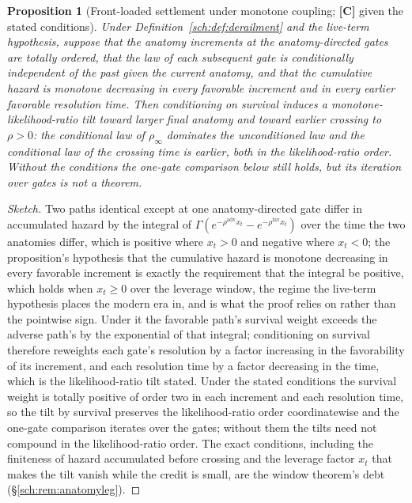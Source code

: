 \documentclass[11pt]{article}
\theoremstyle{plain}
\newtheorem{proposition}[theorem]{Proposition}
\theoremstyle{definition}
\theoremstyle{remark}
\begin{document}
\begin{proposition}[Front-loaded settlement under monotone coupling;
\textbf{[C]} given the stated conditions]\label{sch:prop:settlement}
Under Definition~\ref{sch:def:derailment} and the live-term
hypothesis, suppose that the anatomy increments at the anatomy-directed
gates are totally ordered, that the law of each subsequent gate is
conditionally independent of the past given the current anatomy, and
that the cumulative hazard is monotone decreasing in every favorable
increment and in every earlier favorable resolution time. Then
conditioning on survival induces a monotone-likelihood-ratio tilt
toward larger final anatomy and toward earlier crossing to $\rho>0$: the
conditional law of $\rho_\infty$ dominates the unconditioned law and
the conditional law of the crossing time is earlier, both in the
likelihood-ratio order. Without the conditions the one-gate comparison
below still holds, but its iteration over gates is not a theorem.
\end{proposition}

\begin{proof}[Sketch]
Two paths identical except at one anatomy-directed gate differ in
accumulated hazard by the integral of
$\Gamma(e^{-\rho^{\mathrm{adv}}x_t}-e^{-\rho^{\mathrm{fav}}x_t})$ over the
time the two anatomies differ, which is positive where $x_t>0$ and
negative where $x_t<0$; the proposition's hypothesis that the
cumulative hazard is monotone decreasing in every favorable increment
is exactly the requirement that the integral be positive, which holds
when $x_t\ge0$ over the leverage window, the regime the live-term
hypothesis places the modern era in, and is what the proof relies on
rather than the pointwise sign. Under it the favorable path's survival
weight exceeds the adverse path's by the exponential of that integral; conditioning on survival therefore reweights each gate's
resolution by a factor increasing in the favorability of its
increment, and each resolution time by a factor decreasing in the
time, which is the likelihood-ratio tilt stated. Under the stated conditions the survival weight is totally positive of
order two in each increment and each resolution time, so the tilt by
survival preserves the likelihood-ratio order coordinatewise and the
one-gate comparison iterates over the gates; without them the tilts need
not compound in the likelihood-ratio order. The exact conditions, including the
finiteness of hazard accumulated before crossing and the leverage
factor $x_t$ that makes the tilt vanish while the credit is small,
are the window theorem's debt (\S\ref{sch:rem:anatomyleg}).
\end{proof}
\end{document}
